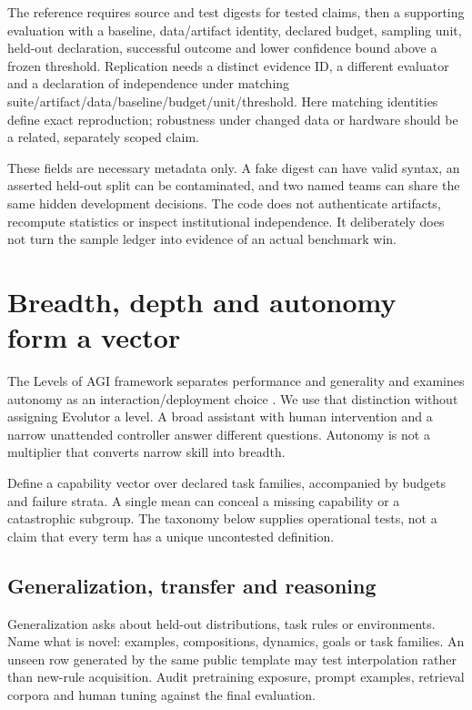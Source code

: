 The reference requires source and test digests for tested claims, then a
supporting evaluation with a baseline, data/artifact identity, declared budget,
sampling unit, held-out declaration, successful outcome and lower confidence
bound above a frozen threshold. Replication needs a distinct evidence ID,
a different evaluator and a declaration of independence under matching
suite/artifact/data/baseline/budget/unit/threshold. Here matching identities
define exact reproduction; robustness under changed data or hardware should
be a related, separately scoped claim.

These fields are necessary metadata only. A fake digest can have valid syntax,
an asserted held-out split can be contaminated, and two named teams can share
the same hidden development decisions. The code does not authenticate artifacts,
recompute statistics or inspect institutional independence. It deliberately
does not turn the sample ledger into evidence of an actual benchmark win.

\section{Breadth, depth and autonomy form a vector}
The Levels of AGI framework separates performance and generality and examines
autonomy as an interaction/deployment choice \cite{evod51:levels}. We use
that distinction without assigning Evolutor a level. A broad assistant with
human intervention and a narrow unattended controller answer different
questions. Autonomy is not a multiplier that converts narrow skill into breadth.

Define a capability vector over declared task families, accompanied by budgets
and failure strata. A single mean can conceal a missing capability or a
catastrophic subgroup. The taxonomy below supplies operational tests, not a
claim that every term has a unique uncontested definition.

\subsection{Generalization, transfer and reasoning}
Generalization asks about held-out distributions, task rules or environments.
Name what is novel: examples, compositions, dynamics, goals or task families.
An unseen row generated by the same public template may test interpolation
rather than new-rule acquisition. Audit pretraining exposure, prompt examples,
retrieval corpora and human tuning against the final evaluation.

